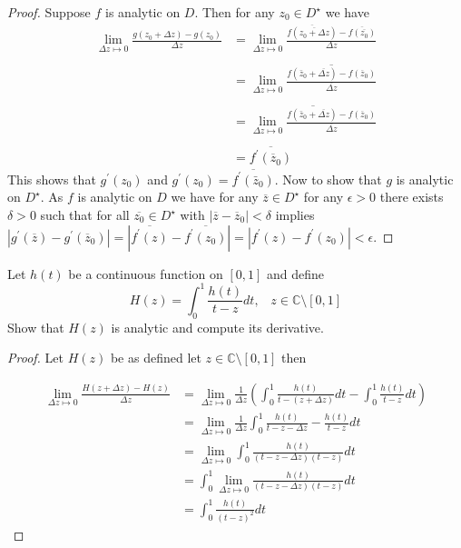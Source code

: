 \documentclass[letter,12pt]{article}
\begin{document}
\begin{proof}
    Suppose $f$ is analytic on $D$. Then for any $z_0\in D^\star$ we have \begin{align*}
    \lim_{\Delta z\mapsto 0} \frac{g(z_0+\Delta z)-g(z_0)}{\Delta z } &= \lim_{\Delta z\mapsto 0} \frac{\overline{f(\overline{z_0+\Delta z})}-\overline{f(\overline{z_0})}}{\Delta z }\\ \\
    &= \lim_{\Delta z\mapsto 0}\overline{\frac{f(\bar z_0 + \overline{\Delta z})- f(\overline z_0)}{\overline {\Delta z}}}\\ \\
    &= \overline{\lim_{\Delta z\mapsto 0}\frac{f(\bar z_0 + \overline{\Delta z})- f(\overline z_0)}{\overline {\Delta z}}}\\ \\
    &= \overline{f^\prime(\overline z_0)}
    \end{align*}
This shows that $g^\prime(z_0)$ and $g^\prime(z_0)=\overline{f^\prime (\bar z_0)}$. 
Now to show that $g$ is analytic on $D^\star$. As $f$ is analytic on $D$ we have for any $\overline{z}\in D^\star$ for any $\epsilon>0$ there exists $\delta >0$ such that for all $\overline{z_0}\in D^\star$ with $|\overline z- \overline z_0|<\delta$ implies $|g^\prime{(\overline{z})}-g^\prime (\overline z_0)|=|\overline{f^\prime (z)}-\overline{f^\prime (z_0)}|=|f^{\prime}(z)-f^\prime(z_0)|<\epsilon$.  
\end{proof}
\begin{tcolorbox}
    Let $h(t)$ be a continuous function on $[0,1]$ and define 
        \[
        H(z)=\int_0^1\frac{h(t)}{t-z}dt, \; \; \; z\in \mathbb{C}\setminus [0,1]
        \]
        Show that $H(z)$ is analytic and compute its derivative.
\end{tcolorbox}

\begin{proof}
    Let $H(z)$ be as defined let $z\in \mathbb{C}\setminus [0,1]$ then 

    \begin{align*}
        \lim_{\Delta z\mapsto 0}\frac{H(z+\Delta z)-H(z)}{\Delta z}&= \lim_{\Delta z\mapsto 0}\frac{1}{\Delta z}\left(\int_0^1\frac{h(t)}{t-(z+\Delta z)}dt -\int_0^1 \frac{h(t)}{t-z}dt \right)\\
        &= \lim_{\Delta z\mapsto 0}\frac{1}{\Delta z}\int_0^1\frac{h(t)}{t-z-\Delta z}-\frac{h(t)}{t-z}dt\\
        &= \lim_{\Delta z\mapsto 0}\int_0^1\frac{h(t)}{(t-z-\Delta z)(t-z)}dt\\ 
        &= \int_0^1\lim_{\Delta z\mapsto 0}\frac{h(t)}{(t-z-\Delta z)(t-z)}dt\\
        &= \int_0^1\frac{h(t)}{(t-z)^2}dt
    \end{align*}
\end{proof}
\end{document}
